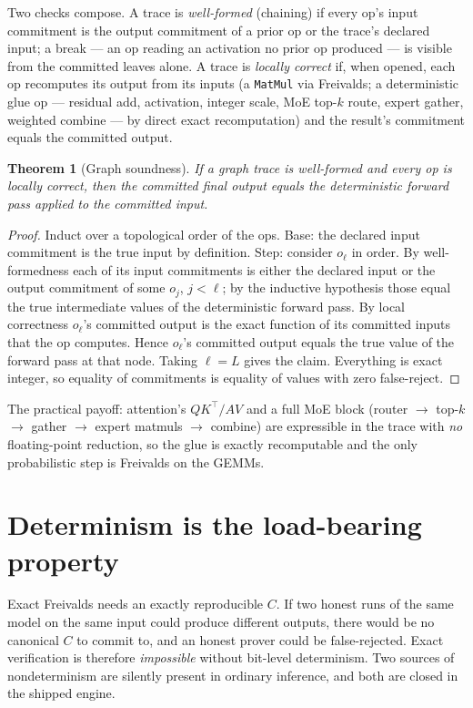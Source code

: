 \documentclass[11pt]{article}
\newtheorem{theorem}{Theorem}
\newcommand{\code}[1]{\texttt{#1}}
\begin{document}
Two checks compose. A trace is \emph{well-formed} (chaining) if every op's input
commitment is the output commitment of a prior op or the trace's declared input; a
break --- an op reading an activation no prior op produced --- is visible from the
committed leaves alone. A trace is \emph{locally correct} if, when opened, each op
recomputes its output from its inputs (a \code{MatMul} via Freivalds; a
deterministic glue op --- residual add, activation, integer scale, MoE top-$k$
route, expert gather, weighted combine --- by direct exact recomputation) and the
result's commitment equals the committed output.

\begin{theorem}[Graph soundness]
\label{thm:graph}
If a graph trace is well-formed and every op is locally correct, then the
committed final output equals the deterministic forward pass applied to the
committed input.
\end{theorem}

\begin{proof}
Induct over a topological order of the ops. Base: the declared input commitment is
the true input by definition. Step: consider $o_\ell$ in order. By well-formedness
each of its input commitments is either the declared input or the output
commitment of some $o_{j}$, $j<\ell$; by the inductive hypothesis those equal the
true intermediate values of the deterministic forward pass. By local correctness
$o_\ell$'s committed output is the exact function of its committed inputs that the
op computes. Hence $o_\ell$'s committed output equals the true value of the
forward pass at that node. Taking $\ell = L$ gives the claim. Everything is exact
integer, so equality of commitments is equality of values with zero false-reject.
\end{proof}

The practical payoff: attention's $QK^\top/AV$ and a full MoE block (router
$\to$ top-$k$ $\to$ gather $\to$ expert matmuls $\to$ combine) are expressible in
the trace with \emph{no} floating-point reduction, so the glue is exactly
recomputable and the only probabilistic step is Freivalds on the GEMMs.

\section{Determinism is the load-bearing property}
\label{sec:determinism}

Exact Freivalds needs an exactly reproducible $C$. If two honest runs of the
same model on the same input could produce different outputs, there would be no
canonical $C$ to commit to, and an honest prover could be false-rejected. Exact
verification is therefore \emph{impossible} without bit-level determinism. Two
sources of nondeterminism are silently present in ordinary inference, and both
are closed in the shipped engine.
\end{document}
